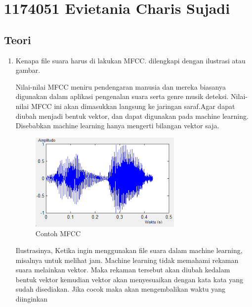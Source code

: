 \section{1174051 Evietania Charis Sujadi}
\subsection{Teori}
\begin{enumerate}
\item Kenapa file suara harus di lakukan MFCC. dilengkapi dengan ilustrasi atau gambar. \\
\par Nilai-nilai MFCC meniru pendengaran manusia dan mereka biasanya digunakan dalam aplikasi pengenalan suara serta genre musik
deteksi. Nilai-nilai MFCC ini akan dimasukkan langsung ke jaringan saraf.Agar dapat diubah menjadi bentuk vektor, dan dapat digunakan pada machine learning. Disebabkan machine learning hanya mengerti bilangan vektor saja.\\
\begin{figure}[H]
\centering
\includegraphics[scale=0.5]{figures/1174051/6/7.png}
\caption{Contoh MFCC}
\label{Teori}
\end{figure}
Ilustrasinya, Ketika ingin menggunakan file suara dalam machine learning, misalnya untuk melihat jam. Machine learning tidak memahami rekaman suara melainkan vektor. Maka rekaman tersebut akan diubah kedalam bentuk vektor kemudian vektor akan menyesuaikan dengan kata kata yang sudah disediakan. Jika cocok maka akan mengembalikan waktu yang diinginkan


\end{enumerate}
